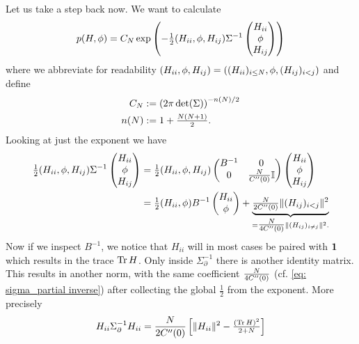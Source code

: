 Let us take a step back now. We want to calculate
\begin{equation*}
	p(H, \phi)
	=C_N\exp\left(
		-\tfrac12
		( H_{ii},\phi, H_{ij} )\Sigma^{-1}
		\begin{pmatrix}
			H_{ii}\\
			\phi\\
			H_{ij}
		\end{pmatrix}
	\right)
\end{equation*}
where we abbreviate for readability \((H_{ii}, \phi, H_{ij})= ((H_{ii})_{i\le
N}, \phi, (H_{ij})_{i<j})\) and define
\begin{align*}
	C_N &:= \left(2\pi\det(\Sigma)\right)^{-n(N)/2}\\
	n(N) &:= 1 + \tfrac{N(N+1)}{2}.
\end{align*}
Looking at just the exponent we have
\begin{align*}
		\tfrac12
		( H_{ii},\phi, H_{ij} )\Sigma^{-1}
		\begin{pmatrix}
			H_{ii}\\
			\phi\\
			H_{ij}
		\end{pmatrix}
		&= 
		\tfrac12
		( H_{ii},\phi, H_{ij} )\begin{pmatrix}
			B^{-1} & 0\\
			0 & \tfrac{N}{C''(0)}\mathbb{I}
		\end{pmatrix}
		\begin{pmatrix}
			H_{ii}\\
			\phi\\
			H_{ij}
		\end{pmatrix}\\
		&= \tfrac12(H_{ii},\phi)B^{-1}\begin{pmatrix}
			H_{ii}\\ \phi
		\end{pmatrix}
		+ \underbrace{\tfrac{N}{2C''(0)}\| (H_{ij})_{i<j}\|^2}_{
			=\tfrac{N}{4C''(0)}\| (H_{ij})_{i\neq j}\|^2.
		}
\end{align*}
Now if we inspect \(B^{-1}\), we notice that \(H_{ii}\) will in most cases be paired
with \(\mathbf{1}\) which results in the trace \(\operatorname{Tr}{H}\). Only inside \(\Sigma_\partial^{-1}\)
there is another identity matrix. This results in another norm, with the
same coefficient \(\frac{N}{4C''(0)}\) (cf. \eqref{eq: sigma_partial
inverse}) after collecting the global \(\tfrac12\) from the exponent. More
precisely
\[
	H_{ii} \Sigma_\partial^{-1} H_{ii}
	= \frac{N}{2C''(0)}
	\left[\|H_{ii}\|^2 - \tfrac{(\operatorname{Tr} H)^2}{2+N}\right]
\]
